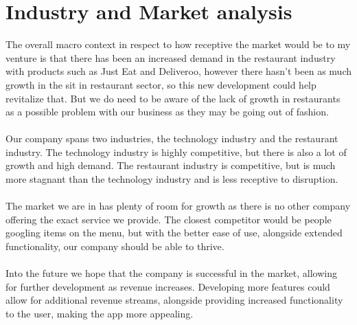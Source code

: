 \documentclass{article}[18pt]
\begin{document}
\section{Industry and Market analysis}
The overall macro context in respect to how receptive the market would be to my venture is that there has been an increased demand in the restaurant industry with products such as Just Eat and Deliveroo, however there hasn't been as much growth in the sit in restaurant sector, so this new development could help revitalize that. But we do need to be aware of the lack of growth in restaurants as a possible problem with our business as they may be going out of fashion.\\
\\
Our company spans two industries, the technology industry and the restaurant industry. The technology industry is highly competitive, but there is also a lot of growth and high demand. The restaurant industry is competitive, but is much more stagnant than the technology industry and is less receptive to disruption.\\
\\
The market we are in has plenty of room for growth as there is no other company offering the exact service we provide. The closest competitor would be people googling items on the menu, but with the better ease of use, alongside extended functionality, our company should be able to thrive.\\
\\
Into the future we hope that the company is successful in the market, allowing for further development as revenue increases. Developing more features could allow for additional revenue streams, alongside providing increased functionality to the user, making the app more appealing.

\end{document}

